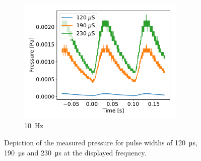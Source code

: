 \documentclass[a4paper,10pt]{article}
\begin{document}
\begin{figure}[htp!]
\begin{subfigure}[t]{0.45 \textwidth}
    \centering
    \includegraphics[height=6cm]{part1_10_hertz.pdf}
    \caption{\SI{10}{\hertz}}
  \end{subfigure}
  \caption{Depiction of the measured pressure for pulse widths of \SI{120}{\micro \s}, \SI{190}{\micro \s} and \SI{230}{\micro \s} at the displayed frequency. }
  \label{fig_pressure_characterization}
\end{figure}
\end{document}

